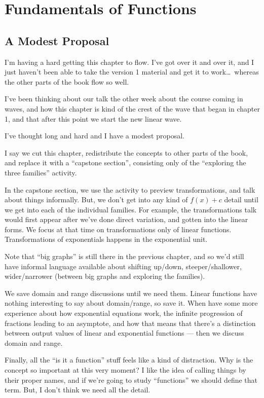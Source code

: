 \chapter{Fundamentals of Functions}
\label{ch:functions}
 
\section{A Modest Proposal}

I'm having a hard getting this chapter to flow. I've got over it and over it, and I just haven't been able to take the version 1 material and get it to work\ldots\ whereas the other parts of the book flow so well.

I've been thinking about our talk the other week about the course coming in waves, and how this chapter is kind of the crest of the wave that began in chapter 1, and that after this point we start the new linear wave.

I've thought long and hard and I have a modest proposal.

I say we cut this chapter, redistribute the concepts to other parts of the book, and replace it with a ``capstone section'', consisting only of the ``exploring the three families'' activity.

In the capstone section, we use the activity to preview transformations, and talk about things informally. But, we don't get into any kind of $f(x)+c$ detail until we get into each of the individual families. For example, the transformations talk would first appear after we've done direct variation, and gotten into the linear forms. We focus at that time on transformations only of linear functions. Transformations of exponentials happens in the exponential unit.

Note that ``big graphs'' is still there in the previous chapter, and so we'd still have informal language available about shifting up/down, steeper/shallower, wider/narrower (between big graphs and exploring the families).

We save domain and range discussions until we need them. Linear functions have nothing interesting to say about domain/range, so save it. When have some more experience about how exponential equations work, the infinite progression of fractions leading to an asymptote, and how that means that there's a distinction between output values of linear and exponential functions --- then we discuss domain and range.

Finally, all the ``is it a function'' stuff feels like a kind of distraction. Why is the concept so important at this very moment? I like the idea of calling things by their proper names, and if we're going to study ``functions'' we should define that term. But, I don't think we need all the detail.

